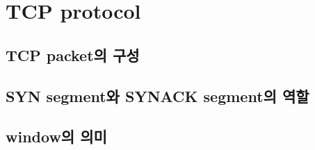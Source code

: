 \section{TCP protocol}

\subsection{TCP packet의 구성}

\subsection{SYN segment와 SYNACK segment의 역할}

\subsection{window의 의미}